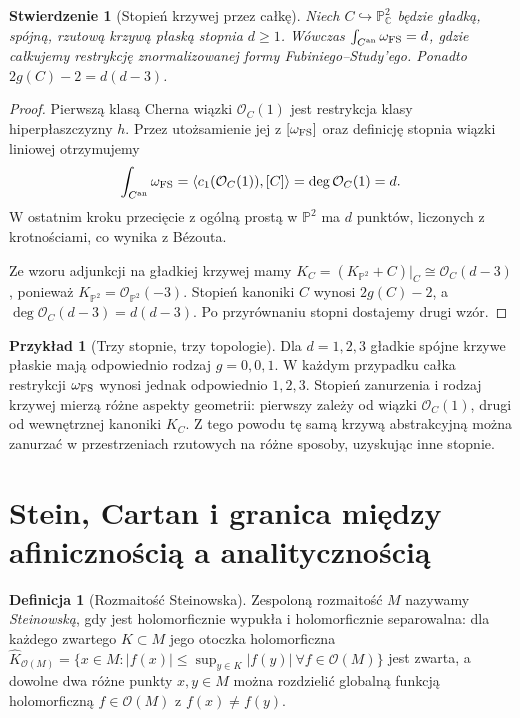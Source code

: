\documentclass[11pt,a4paper,openany]{report}
\numberwithin{equation}{section}
\theoremstyle{plain}
\newtheorem{stwierdzenie}[twierdzenie]{Stwierdzenie}
\theoremstyle{definition}
\newtheorem{definicja}[twierdzenie]{Definicja}
\newtheorem{przyklad}[twierdzenie]{Przykład}
\theoremstyle{remark}
\newcommand{\C}{\mathbb C}
\newcommand{\PP}{\mathbb P}
\begin{document}
\begin{stwierdzenie}[Stopień krzywej przez całkę]
Niech $C\hookrightarrow\PP^2_\C$ będzie gładką,
spójną, rzutową krzywą płaską stopnia $d\ge1$.
Wówczas
$\int_{C^{\rm an}}\omega_{\rm FS}=d$,
gdzie całkujemy restrykcję znormalizowanej formy
Fubiniego--Study'ego. Ponadto
$2g(C)-2=d(d-3)$.
\end{stwierdzenie}
\begin{proof}
Pierwszą klasą Cherna wiązki $\mathcal O_C(1)$
jest restrykcja klasy hiperpłaszczyzny $h$.
Przez utożsamienie jej z $[\omega_{\rm FS}]$
oraz definicję stopnia wiązki liniowej otrzymujemy
\[
 \int_{C^{\rm an}}\omega_{\rm FS}
 =\langle c_1(\mathcal O_C(1)),[C]\rangle
 =\deg\mathcal O_C(1)=d.
\]
W ostatnim kroku przecięcie z ogólną prostą w
$\PP^2$ ma $d$ punktów, liczonych z krotnościami,
co wynika z Bézouta.

Ze wzoru adjunkcji na gładkiej krzywej mamy
$K_C=(K_{\PP^2}+C)|_C\cong\mathcal O_C(d-3)$,
ponieważ $K_{\PP^2}=\mathcal O_{\PP^2}(-3)$.
Stopień kanoniki $C$ wynosi $2g(C)-2$,
a $\deg\mathcal O_C(d-3)=d(d-3)$. Po przyrównaniu
stopni dostajemy drugi wzór.
\end{proof}

\begin{przyklad}[Trzy stopnie, trzy topologie]
Dla $d=1,2,3$ gładkie spójne krzywe płaskie mają
odpowiednio rodzaj $g=0,0,1$. W każdym przypadku
całka restrykcji $\omega_{\rm FS}$ wynosi jednak
odpowiednio $1,2,3$. Stopień zanurzenia i rodzaj
krzywej mierzą różne aspekty geometrii: pierwszy
zależy od wiązki $\mathcal O_C(1)$, drugi od
wewnętrznej kanoniki $K_C$. Z tego powodu tę samą
krzywą abstrakcyjną można zanurzać w przestrzeniach
rzutowych na różne sposoby, uzyskując inne stopnie.
\end{przyklad}

\section{Stein, Cartan i granica między afinicznością a analitycznością}
\label{sec:ga9-stein}

\begin{definicja}[Rozmaitość Steinowska]
Zespoloną rozmaitość $M$ nazywamy \emph{Steinowską},
gdy jest holomorficznie wypukła i holomorficznie
separowalna: dla każdego zwartego $K\subset M$
jego otoczka holomorficzna
$\widehat K_{\mathcal O(M)}=
 \{x\in M:|f(x)|\le\sup_{y\in K}|f(y)|\ \forall f\in\mathcal O(M)\}$
jest zwarta, a dowolne dwa różne punkty $x,y\in M$
można rozdzielić globalną funkcją holomorficzną
$f\in\mathcal O(M)$ z $f(x)\ne f(y)$.
\end{definicja}
\end{document}
